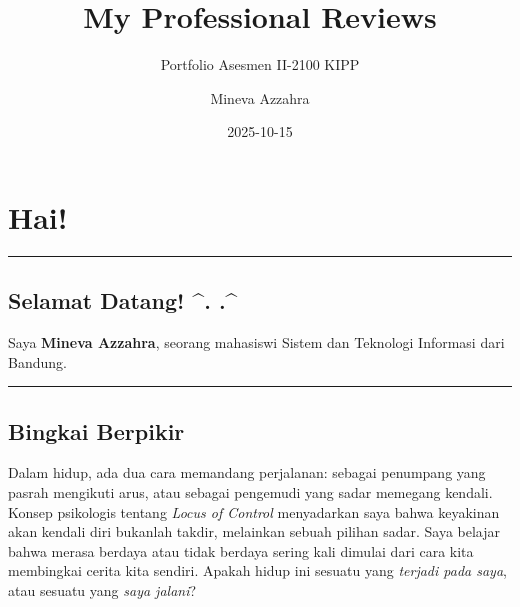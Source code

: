 \documentclass[
  letterpaper,
  DIV=11,
  numbers=noendperiod]{scrreprt}
\title{My Professional Reviews}
\subtitle{Portfolio Asesmen II-2100 KIPP}
\author{Mineva Azzahra}
\date{2025-10-15}
\renewcommand*\contentsname{Table of contents}
\newcommand\contentsname{Table of contents}
\begin{document}
\maketitle

\renewcommand*\contentsname{Table of contents}
{
\hypersetup{linkcolor=}
\setcounter{tocdepth}{2}
\tableofcontents
}


\chapter*{Hai!}\label{hai}


\begin{center}\rule{0.5\linewidth}{0.5pt}\end{center}

\section*{Selamat Datang! \^{}. .\^{}}\label{selamat-datang-.-.}


Saya \textbf{Mineva Azzahra}, seorang mahasiswi Sistem dan Teknologi
Informasi dari Bandung.

\begin{center}\rule{0.5\linewidth}{0.5pt}\end{center}

\section*{Bingkai Berpikir}\label{bingkai-berpikir}


Dalam hidup, ada dua cara memandang perjalanan: sebagai penumpang yang
pasrah mengikuti arus, atau sebagai pengemudi yang sadar memegang
kendali. Konsep psikologis tentang \emph{Locus of Control} menyadarkan
saya bahwa keyakinan akan kendali diri bukanlah takdir, melainkan sebuah
pilihan sadar. Saya belajar bahwa merasa berdaya atau tidak berdaya
sering kali dimulai dari cara kita membingkai cerita kita sendiri.
Apakah hidup ini sesuatu yang \emph{terjadi pada saya}, atau sesuatu
yang \emph{saya jalani}?

\end{document}
